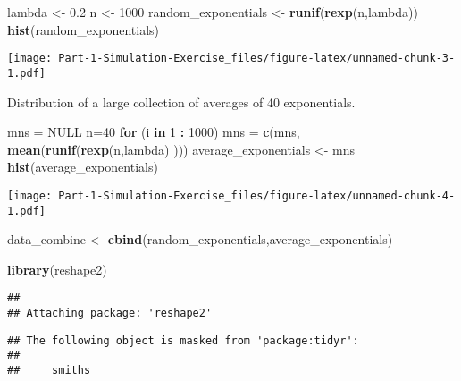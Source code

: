 \documentclass[]{article}
\newenvironment{Shaded}{\begin{snugshade}}{\end{snugshade}}
\newcommand{\KeywordTok}[1]{\textcolor[rgb]{0.13,0.29,0.53}{\textbf{#1}}}
\newcommand{\DecValTok}[1]{\textcolor[rgb]{0.00,0.00,0.81}{#1}}
\newcommand{\FloatTok}[1]{\textcolor[rgb]{0.00,0.00,0.81}{#1}}
\newcommand{\StringTok}[1]{\textcolor[rgb]{0.31,0.60,0.02}{#1}}
\newcommand{\OtherTok}[1]{\textcolor[rgb]{0.56,0.35,0.01}{#1}}
\newcommand{\ControlFlowTok}[1]{\textcolor[rgb]{0.13,0.29,0.53}{\textbf{#1}}}
\newcommand{\OperatorTok}[1]{\textcolor[rgb]{0.81,0.36,0.00}{\textbf{#1}}}
\newcommand{\NormalTok}[1]{#1}
\begin{document}
\begin{Shaded}
\begin{Highlighting}[]
\NormalTok{lambda <-}\StringTok{ }\FloatTok{0.2}
\NormalTok{n <-}\StringTok{ }\DecValTok{1000}
\NormalTok{random_exponentials <-}\StringTok{ }\KeywordTok{runif}\NormalTok{(}\KeywordTok{rexp}\NormalTok{(n,lambda))}
\KeywordTok{hist}\NormalTok{(random_exponentials)}
\end{Highlighting}
\end{Shaded}

\texttt{[image: Part-1-Simulation-Exercise\_files/figure-latex/unnamed-chunk-3-1.pdf]}

Distribution of a large collection of averages of 40 exponentials.

\begin{Shaded}
\begin{Highlighting}[]
\NormalTok{mns =}\StringTok{ }\OtherTok{NULL}
\NormalTok{n=}\DecValTok{40}
\ControlFlowTok{for}\NormalTok{ (i }\ControlFlowTok{in} \DecValTok{1} \OperatorTok{:}\StringTok{ }\DecValTok{1000}\NormalTok{) mns =}\StringTok{ }\KeywordTok{c}\NormalTok{(mns, }\KeywordTok{mean}\NormalTok{(}\KeywordTok{runif}\NormalTok{(}\KeywordTok{rexp}\NormalTok{(n,lambda) )))}
\NormalTok{average_exponentials <-}\StringTok{ }\NormalTok{mns}
\KeywordTok{hist}\NormalTok{(average_exponentials)}
\end{Highlighting}
\end{Shaded}

\texttt{[image: Part-1-Simulation-Exercise\_files/figure-latex/unnamed-chunk-4-1.pdf]}

\begin{Shaded}
\begin{Highlighting}[]
\NormalTok{data_combine <-}\StringTok{ }\KeywordTok{cbind}\NormalTok{(random_exponentials,average_exponentials)}
\end{Highlighting}
\end{Shaded}

\begin{Shaded}
\begin{Highlighting}[]
\KeywordTok{library}\NormalTok{(reshape2)}
\end{Highlighting}
\end{Shaded}

\begin{verbatim}
## 
## Attaching package: 'reshape2'
\end{verbatim}

\begin{verbatim}
## The following object is masked from 'package:tidyr':
## 
##     smiths
\end{verbatim}
\end{document}
